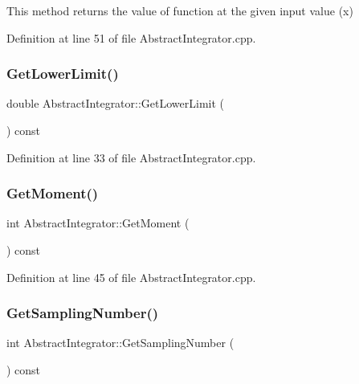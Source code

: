 This method returns the value of function at the given input value (x) 



Definition at line 51 of file Abstract\+Integrator.\+cpp.

\mbox{\label{class_abstract_integrator_ae27a09d1e3fb0a30ce9545a4d8f29cad}} 
\subsubsection{\texorpdfstring{Get\+Lower\+Limit()}{GetLowerLimit()}}
{\footnotesize\ttfamily double Abstract\+Integrator\+::\+Get\+Lower\+Limit (\begin{DoxyParamCaption}{ }\end{DoxyParamCaption}) const}



Definition at line 33 of file Abstract\+Integrator.\+cpp.

\mbox{\label{class_abstract_integrator_a7f709ab302dfe70b5f0f2ce80456fcdb}} 
\subsubsection{\texorpdfstring{Get\+Moment()}{GetMoment()}}
{\footnotesize\ttfamily int Abstract\+Integrator\+::\+Get\+Moment (\begin{DoxyParamCaption}{ }\end{DoxyParamCaption}) const}



Definition at line 45 of file Abstract\+Integrator.\+cpp.

\mbox{\label{class_abstract_integrator_ac58629ec6822b3beeefdd1323b627704}} 
\subsubsection{\texorpdfstring{Get\+Sampling\+Number()}{GetSamplingNumber()}}
{\footnotesize\ttfamily int Abstract\+Integrator\+::\+Get\+Sampling\+Number (\begin{DoxyParamCaption}{ }\end{DoxyParamCaption}) const}




